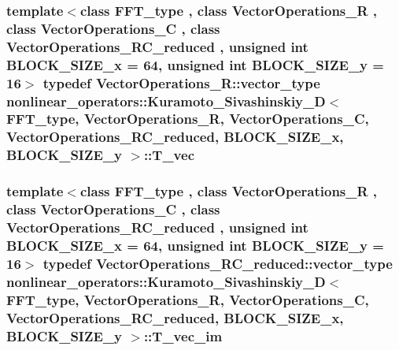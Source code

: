 \hypertarget{classnonlinear__operators_1_1Kuramoto__Sivashinskiy__2D_ab3ac2eb04396d928f24edd66d2b9f37d}{
\subsubsection[{T\-\_\-vec}]{\setlength{\rightskip}{0pt plus 5cm}template$<$class F\-F\-T\-\_\-type , class Vector\-Operations\-\_\-\-R , class Vector\-Operations\-\_\-\-C , class Vector\-Operations\-\_\-\-R\-C\-\_\-reduced , unsigned int B\-L\-O\-C\-K\-\_\-\-S\-I\-Z\-E\-\_\-x = 64, unsigned int B\-L\-O\-C\-K\-\_\-\-S\-I\-Z\-E\-\_\-y = 16$>$ typedef Vector\-Operations\-\_\-\-R\-::vector\-\_\-type {\bf nonlinear\-\_\-operators\-::\-Kuramoto\-\_\-\-Sivashinskiy\-\_\-D}$<$ F\-F\-T\-\_\-type, Vector\-Operations\-\_\-\-R, Vector\-Operations\-\_\-\-C, Vector\-Operations\-\_\-\-R\-C\-\_\-reduced, B\-L\-O\-C\-K\-\_\-\-S\-I\-Z\-E\-\_\-x, B\-L\-O\-C\-K\-\_\-\-S\-I\-Z\-E\-\_\-y $>$\-::{\bf T\-\_\-vec}}}\label{classnonlinear__operators_1_1Kuramoto__Sivashinskiy__2D_ab3ac2eb04396d928f24edd66d2b9f37d}
\hypertarget{classnonlinear__operators_1_1Kuramoto__Sivashinskiy__2D_a77c514db154eff62f7fbc39f78426f4d}{
\subsubsection[{T\-\_\-vec\-\_\-im}]{\setlength{\rightskip}{0pt plus 5cm}template$<$class F\-F\-T\-\_\-type , class Vector\-Operations\-\_\-\-R , class Vector\-Operations\-\_\-\-C , class Vector\-Operations\-\_\-\-R\-C\-\_\-reduced , unsigned int B\-L\-O\-C\-K\-\_\-\-S\-I\-Z\-E\-\_\-x = 64, unsigned int B\-L\-O\-C\-K\-\_\-\-S\-I\-Z\-E\-\_\-y = 16$>$ typedef Vector\-Operations\-\_\-\-R\-C\-\_\-reduced\-::vector\-\_\-type {\bf nonlinear\-\_\-operators\-::\-Kuramoto\-\_\-\-Sivashinskiy\-\_\-D}$<$ F\-F\-T\-\_\-type, Vector\-Operations\-\_\-\-R, Vector\-Operations\-\_\-\-C, Vector\-Operations\-\_\-\-R\-C\-\_\-reduced, B\-L\-O\-C\-K\-\_\-\-S\-I\-Z\-E\-\_\-x, B\-L\-O\-C\-K\-\_\-\-S\-I\-Z\-E\-\_\-y $>$\-::{\bf T\-\_\-vec\-\_\-im}}}\label{classnonlinear__operators_1_1Kuramoto__Sivashinskiy__2D_a77c514db154eff62f7fbc39f78426f4d}
